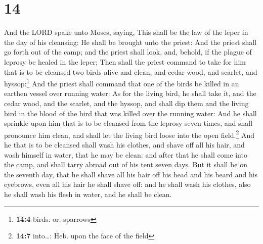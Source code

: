 \hypertarget{section-13}{%
\section{14}\label{section-13}}

 And the LORD spake unto Moses, saying, 
This shall be the law of the leper in the day of his cleansing: He shall
be brought unto the priest:  And the priest shall go forth
out of the camp; and the priest shall look, and, behold, if the plague
of leprosy be healed in the leper;  Then shall the priest
command to take for him that is to be cleansed two birds alive and
clean, and cedar wood, and scarlet, and hyssop:\footnote{\textbf{14:4}
  birds: or, sparrows}  And the priest shall command that
one of the birds be killed in an earthen vessel over running water:
 As for the living bird, he shall take it, and the cedar
wood, and the scarlet, and the hyssop, and shall dip them and the living
bird in the blood of the bird that was killed over the running water:
 And he shall sprinkle upon him that is to be cleansed
from the leprosy seven times, and shall pronounce him clean, and shall
let the living bird loose into the open field.\footnote{\textbf{14:7}
  into\ldots: Heb. upon the face of the field}  And he
that is to be cleansed shall wash his clothes, and shave off all his
hair, and wash himself in water, that he may be clean: and after that he
shall come into the camp, and shall tarry abroad out of his tent seven
days.  But it shall be on the seventh day, that he shall
shave all his hair off his head and his beard and his eyebrows, even all
his hair he shall shave off: and he shall wash his clothes, also he
shall wash his flesh in water, and he shall be clean.

